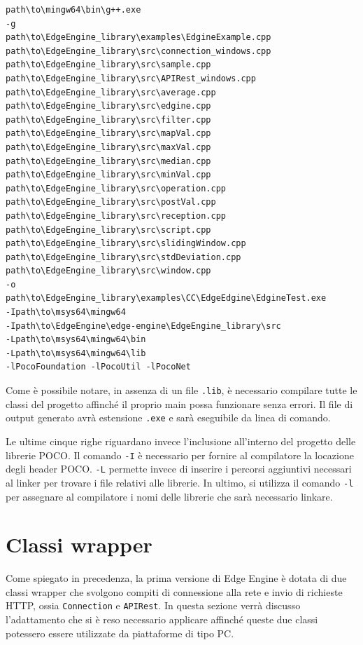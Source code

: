 \begin{verbatim}
path\to\mingw64\bin\g++.exe 
-g 
path\to\EdgeEngine_library\examples\EdgineExample.cpp
path\to\EdgeEngine_library\src\connection_windows.cpp
path\to\EdgeEngine_library\src\sample.cpp
path\to\EdgeEngine_library\src\APIRest_windows.cpp
path\to\EdgeEngine_library\src\average.cpp
path\to\EdgeEngine_library\src\edgine.cpp
path\to\EdgeEngine_library\src\filter.cpp
path\to\EdgeEngine_library\src\mapVal.cpp
path\to\EdgeEngine_library\src\maxVal.cpp
path\to\EdgeEngine_library\src\median.cpp
path\to\EdgeEngine_library\src\minVal.cpp
path\to\EdgeEngine_library\src\operation.cpp
path\to\EdgeEngine_library\src\postVal.cpp
path\to\EdgeEngine_library\src\reception.cpp
path\to\EdgeEngine_library\src\script.cpp
path\to\EdgeEngine_library\src\slidingWindow.cpp
path\to\EdgeEngine_library\src\stdDeviation.cpp
path\to\EdgeEngine_library\src\window.cpp
-o
path\to\EdgeEngine_library\examples\CC\EdgeEdgine\EdgineTest.exe
-Ipath\to\msys64\mingw64
-Ipath\to\EdgeEngine\edge-engine\EdgeEngine_library\src
-Lpath\to\msys64\mingw64\bin
-Lpath\to\msys64\mingw64\lib
-lPocoFoundation -lPocoUtil -lPocoNet
\end{verbatim}

Come è possibile notare, in assenza di un file \texttt{.lib}, è necessario compilare tutte le classi del progetto affinché il proprio main possa funzionare senza errori. Il file di output generato avrà estensione \texttt{.exe} e sarà eseguibile da linea di comando.

Le ultime cinque righe riguardano invece l'inclusione all'interno del progetto delle librerie POCO. Il comando \texttt{-I} è necessario per fornire al compilatore la locazione degli header POCO. \texttt{-L}  permette invece di inserire i percorsi aggiuntivi necessari al linker per trovare i file relativi alle librerie. In ultimo, si utilizza il comando \texttt{-l} per assegnare al compilatore i nomi delle librerie che sarà necessario linkare.  
\section{Classi wrapper}
Come spiegato in precedenza, la prima versione di Edge Engine è dotata di due classi wrapper che svolgono compiti di connessione alla rete e invio di richieste HTTP, ossia \texttt{Connection} e \texttt{APIRest}. In questa sezione verrà discusso l’adattamento che si è reso necessario applicare affinché queste due classi potessero essere utilizzate da piattaforme di tipo PC.


